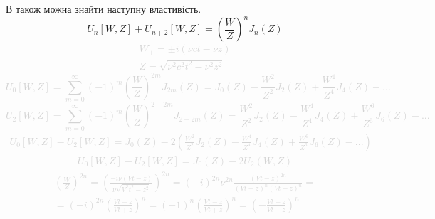 В \cite{imp:Boersma1961} також можна знайти наступну властивість.
%
\begin{equation}
U_n \left[ W, Z \right] + U_{n+2} \left[ W, Z \right] = 
\left( \frac{W}{Z} \right)^n J_n (Z)
\end{equation}
%
\textcolor{lightgray} { \begin{equation*} \begin{aligned}
W_\pm = \pm i (\nu ct - \nu z) \\
Z = \sqrt{\nu^2 c^2t^2 - \nu^2 z^2}
\end{aligned} \end{equation*} }
%
\textcolor{lightgray}{ \begin{equation*}
U_0 \left[ W, Z \right] = \sum \limits_{m = 0}^{\infty} (-1)^m
\left( \frac{W}{Z} \right)^{2m} J_{2m} (Z) = J_0 (Z) - \frac{W^2}{Z^2} J_2 (Z) +
\frac{W^4}{Z^4} J_4 (Z) - ...
\end{equation*} }
%
\textcolor{lightgray}{ \begin{equation*}
U_2 \left[ W, Z \right] = \sum \limits_{m = 0}^{\infty} (-1)^m
\left( \frac{W}{Z} \right)^{2 + 2m} J_{2 + 2m} (Z) = 
\frac{W^2}{Z^2} J_2 (Z) - \frac{W^4}{Z^4} J_4 (Z) + \frac{W^6}{Z^6} J_6 (Z) - ...
\end{equation*} }
%
\textcolor{lightgray}{ \begin{equation*} \begin{aligned}
U_0 [W, Z] - U_2 [W, Z] = J_0(Z) - 2 \left( \frac{W^2}{Z^2} J_2 (Z) - 
\frac{W^4}{Z^4} J_4 (Z) + \frac{W^6}{Z^6} J_6 (Z) - ... \right)
\end{aligned} \end{equation*} }
%
\textcolor{lightgray}{ \begin{equation*} \begin{aligned}
U_0 [W, Z] - U_2 [W, Z] = J_0(Z) - 2 U_2(W,Z)
\end{aligned} \end{equation*} }
%
\textcolor{lightgray}{ \begin{equation*} \begin{aligned}
\left( \frac{W}{Z} \right)^{2n} = \left( 
\frac{- i \nu (\mathit{V}t - z)}
{\nu \sqrt{\mathit{V}^2t^2 - z^2}} \right)^{2n} = 
(-i)^{2n} \nu^{2n} \frac{(\mathit{V}t - z)^{2n}}
{(\mathit{V}t - z)^n (\mathit{V}t + z)^n} = \\
= (-i)^{2n} \left( \frac{\mathit{V}t - z}{\mathit{V}t + z} \right)^n = 
(-1)^{n} \left( \frac{\mathit{V}t - z}{\mathit{V}t + z} \right)^n = 
\left( - \frac{\mathit{V}t - z}{\mathit{V}t + z} \right)^n
\end{aligned} \end{equation*} }
